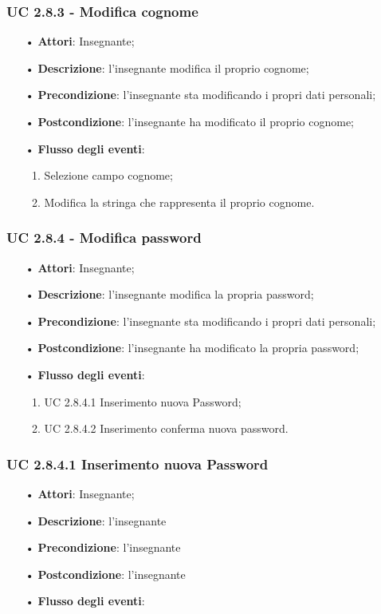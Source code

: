 \subsubsection{UC 2.8.3 - Modifica cognome}
\begin{itemize}
	\item[•]\textbf{Attori}: Insegnante;
	\item[•]\textbf{Descrizione}: l'insegnante modifica il proprio cognome;
	\item[•]\textbf{Precondizione}: l'insegnante sta modificando i propri dati personali;
	\item[•]\textbf{Postcondizione}: l'insegnante ha modificato il proprio cognome; 
	\item[•]\textbf{Flusso degli eventi}: 
	\begin{enumerate}
		\item Selezione campo cognome;
		\item Modifica la stringa che rappresenta il proprio cognome.
	\end{enumerate}
\end{itemize}


\subsubsection{UC 2.8.4 - Modifica password}
\begin{itemize}
	\item[•]\textbf{Attori}: Insegnante;
	\item[•]\textbf{Descrizione}: l'insegnante modifica la propria password;
	\item[•]\textbf{Precondizione}: l'insegnante sta modificando i propri dati personali;
	\item[•]\textbf{Postcondizione}: l'insegnante ha modificato la propria password; 
	\item[•]\textbf{Flusso degli eventi}: 
	\begin{enumerate}
		\item UC 2.8.4.1 Inserimento nuova Password;
		\item UC 2.8.4.2 Inserimento conferma nuova password.
	\end{enumerate}
\end{itemize}

\subsubsection{UC 2.8.4.1 Inserimento nuova Password}
\begin{itemize}
	\item[•] \textbf{Attori}: Insegnante;
	\item[•] \textbf{Descrizione}: l'insegnante
	\item[•] \textbf{Precondizione}: l'insegnante
	\item[•] \textbf{Postcondizione}: l'insegnante
	\item[•] \textbf{Flusso degli eventi}: 
\end{itemize}


